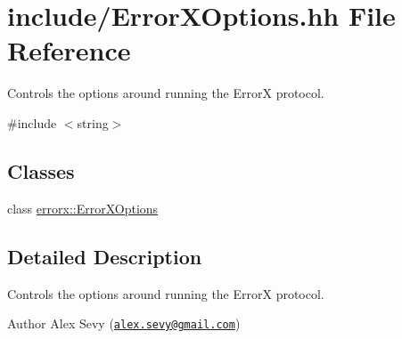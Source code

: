 \hypertarget{_error_x_options_8hh}{}\section{include/\+Error\+X\+Options.hh File Reference}
\label{_error_x_options_8hh}


Controls the options around running the ErrorX protocol.  


{\ttfamily \#include $<$string$>$}\newline
\subsection*{Classes}
\begin{DoxyCompactItemize}
\item 
class \mbox{\hyperlink{classerrorx_1_1_error_x_options}{errorx\+::\+Error\+X\+Options}}
\end{DoxyCompactItemize}


\subsection{Detailed Description}
Controls the options around running the ErrorX protocol. 

\begin{DoxyAuthor}{Author}
Alex Sevy (\href{mailto:alex.sevy@gmail.com}{\tt alex.\+sevy@gmail.\+com}) 
\end{DoxyAuthor}
